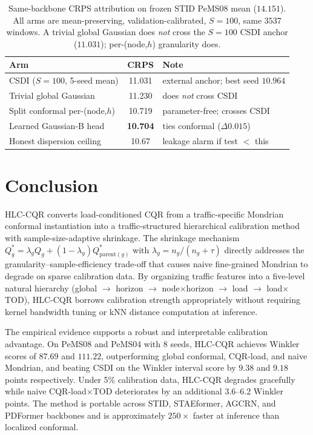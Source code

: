 \documentclass[letterpaper,journal]{IEEEtran}
\begin{document}
\begin{table}[t]
\centering
\caption{Same-backbone CRPS attribution on frozen STID PeMS08 mean ($14.151$).
All arms are mean-preserving, validation-calibrated, $S=100$, same $3537$ windows.
A trivial global Gaussian does \emph{not} cross the $S=100$ CSDI anchor ($11.031$);
per-(node,$h$) granularity does.}
\label{tab:stid_ladder}
\footnotesize
\begin{tabular}{lcl}
\toprule
Arm & CRPS & Note \\
\midrule
CSDI ($S=100$, 5-seed mean)    & 11.031 & external anchor; best seed $10.964$ \\
Trivial global Gaussian        & 11.230 & does \emph{not} cross CSDI \\
Split conformal per-(node,$h$) & 10.719 & parameter-free; crosses CSDI \\
Learned Gaussian-B head        & \textbf{10.704} & ties conformal ($\Delta0.015$) \\
Honest dispersion ceiling      & 10.67  & leakage alarm if test $<$ this \\
\bottomrule
\end{tabular}
\end{table}

\section{Conclusion}

HLC-CQR converts load-conditioned CQR from a traffic-specific Mondrian
conformal instantiation into a traffic-structured hierarchical calibration
method with sample-size-adaptive shrinkage.  The shrinkage mechanism
$Q^{*}_{g}=\lambda_{g}Q_{g}+(1-\lambda_{g})Q^{*}_{\text{parent}(g)}$ with
$\lambda_{g}=n_{g}/(n_{g}+\tau)$ directly addresses the
granularity--sample-efficiency trade-off that causes naive fine-grained
Mondrian to degrade on sparse calibration data.  By organizing traffic
features into a five-level natural hierarchy (global $\to$ horizon $\to$
node$\times$horizon $\to$ load $\to$ load$\times$TOD), HLC-CQR borrows
calibration strength appropriately without requiring kernel bandwidth tuning
or kNN distance computation at inference.

The empirical evidence supports a robust and interpretable calibration
advantage.  On PeMS08 and PeMS04 with 8 seeds, HLC-CQR achieves Winkler
scores of $87.69$ and $111.22$, outperforming global conformal, CQR-load,
and naive Mondrian, and beating CSDI on the Winkler interval score by
$9.38$ and $9.18$ points respectively.  Under 5\% calibration data, HLC-CQR
degrades gracefully while naive CQR-load$\times$TOD deteriorates by an
additional 3.6--6.2 Winkler points.  The method is portable across STID,
STAEformer, AGCRN, and PDFormer backbones and is approximately $250\times$
faster at inference than localized conformal.
\end{document}
